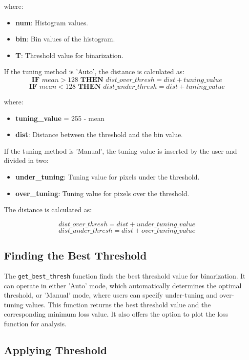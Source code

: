 \documentclass{article}
\begin{document}
where:
\begin{itemize}
\item \textbf{num}: Histogram values.
\item \textbf{bin}: Bin values of the histogram.
\item \textbf{T}: Threshold value for binarization.
\end{itemize}

\noindent
If the tuning method is 'Auto', the distance is calculated as:
$$
\textbf{IF } {{mean}} > 128 \textbf{ THEN } {{dist\_over\_thresh}} = {{dist}} + {{tuning\_value}}
$$
$$
\textbf{IF } {{mean}} < 128 \textbf{ THEN } {{dist\_under\_thresh}} = {{dist}} + {{tuning\_value}}
$$

where:
\begin{itemize}
\item \textbf{{tuning\_value}} = 255 - mean
\item \textbf{dist}: Distance between the threshold and the bin value.
\end{itemize}

\noindent
If the tuning method is 'Manual', the tuning value is inserted by the user and divided in two:
\begin{itemize}
\item \textbf{under\_tuning}: Tuning value for pixels under the threshold.
\item \textbf{over\_tuning}: Tuning value for pixels over the threshold.
\end{itemize}

\noindent
The distance is calculated as:

$$
{{dist\_over\_thresh}} = {{dist}} + {{under\_tuning\_value}}
$$
$$
{{dist\_under\_thresh}} = {{dist}} + {{over\_tuning\_value}}
$$

\subsection{Finding the Best Threshold}

The \texttt{get\_best\_thresh} function finds the best threshold value for binarization. It can operate in either 'Auto' mode, which automatically determines the optimal threshold, or 'Manual' mode, where users can specify under-tuning and over-tuning values. This function returns the best threshold value and the corresponding minimum loss value. It also offers the option to plot the loss function for analysis.

\subsection{Applying Threshold}
\end{document}
